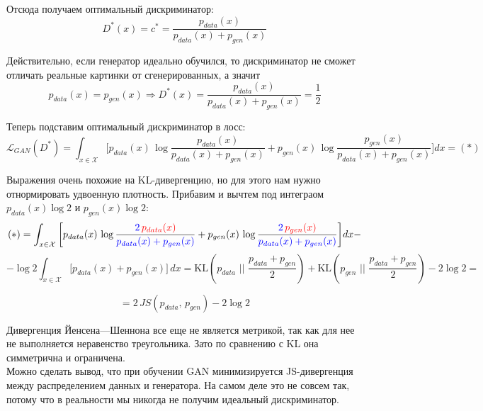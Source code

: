 \documentclass[12pt]{article}
\theoremstyle{definition} %
\theoremstyle{plain} %
\theoremstyle{remark} %
\begin{document}
    Отсюда получаем оптимальный дискриминатор:
    \[
    D^*(x) = c^* = \frac{p_{data}(x)}{p_{data}(x) + p_{gen}(x)}
    \]

    Действительно, если генератор идеально обучился, то дискриминатор не сможет отличать реальные картинки от сгенерированных, а значит 
    \[
    p_{data}(x) = p_{gen}(x) \Longrightarrow D^*(x) = \frac{p_{data}(x)}{p_{data}(x) + p_{gen}(x)} = \frac{1}{2}
    \]

    \pagebreak

    Теперь подставим оптимальный дискриминатор в лосс:
    \[
    \mathcal{L}_{GAN}(D^*) = \int_{x \in \mathcal{X}} \bigg[p_{data}(x) \, \log \frac{p_{data}(x)}{p_{data}(x) + p_{gen}(x)} + p_{gen}(x) \, \log \frac{p_{gen}(x)}{p_{data}(x) + p_{gen}(x)}\bigg]dx = (*)
    \]

    Выражения очень похожие на KL-дивергенцию, но для этого нам нужно отнормировать удвоенную плотность. Прибавим и вычтем под интеграом $p_{data}(x)\log2 $ и $p_{gen}(x)\log 2:$
    \[
    (*) =  \int_{x \in \mathcal{X}} \bigg[p_{data}(x) \, \log \frac{\textcolor{blue}{2} \, \textcolor{red}{p_{data}(x)}}{\textcolor{blue}{p_{data}(x) + p_{gen}(x)}} + p_{gen}(x) \, \log \frac{\textcolor{blue}{2} \, \textcolor{red}{p_{gen}(x)}}{\textcolor{blue}{p_{data}(x) + p_{gen}(x)}}\bigg]dx -
    \]
    \[
    - \log2 \int_{x \in \mathcal{X}} \bigg[p_{data}(x) + p_{gen}(x)\bigg] \, dx = \text{KL}\left(p_{data} \,\, \bigg|\bigg| \,\,\frac{p_{data} + p_{gen}}{2}\right) + \text{KL}\left(p_{gen} \,\, \bigg|\bigg| \,\,\frac{p_{data} + p_{gen}}{2}\right) - 2\log 2 = 
    \]

    \[
    = 2 \, JS(p_{data}, \, p_{gen}) - 2\log 2
    \]

    \begin{center}
    \end{center}

    Дивергенция Йенсена—Шеннона все еще не является метрикой, так как для нее не выполняется неравенство треугольника. Зато по сравнению с KL она симметрична и ограничена. \\

    Можно сделать вывод, что при обучении GAN минимизируется JS-дивергенция между распределением данных и генератора. На самом деле это не совсем так, потому что в реальности мы никогда не получим идеальный дискриминатор. \\
    
\end{document}
